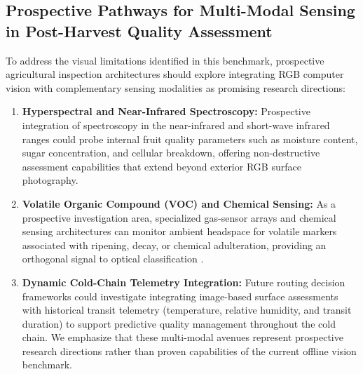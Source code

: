 \vspace*{-3pt}\enlargethispage{\baselineskip}
\subsection{Prospective Pathways for Multi-Modal Sensing in Post-Harvest Quality Assessment}
\label{sec:discussion_recommendations}

To address the visual limitations identified in this benchmark, prospective agricultural inspection architectures should explore integrating RGB computer vision with complementary sensing modalities as promising research directions:
\begin{enumerate}
\setlength{\itemsep}{0pt}
\setlength{\parsep}{0pt}
\setlength{\parskip}{0pt}
\setlength{\topsep}{1pt}
\setlength{\partopsep}{0pt}
\item \textbf{Hyperspectral and Near-Infrared Spectroscopy:} Prospective integration of spectroscopy in the near-infrared and short-wave infrared ranges could probe internal fruit quality parameters such as moisture content, sugar concentration, and cellular breakdown, offering non-destructive assessment capabilities that extend beyond exterior RGB surface photography.
\item \textbf{Volatile Organic Compound (VOC) and Chemical Sensing:} As a prospective investigation area, specialized gas-sensor arrays and chemical sensing architectures can monitor ambient headspace for volatile markers associated with ripening, decay, or chemical adulteration, providing an orthogonal signal to optical classification \cite{sattar2024sensornet}.
\item \textbf{Dynamic Cold-Chain Telemetry Integration:} Future routing decision frameworks could investigate integrating image-based surface assessments with historical transit telemetry (temperature, relative humidity, and transit duration) to support predictive quality management throughout the cold chain. We emphasize that these multi-modal avenues represent prospective research directions rather than proven capabilities of the current offline vision benchmark.
\end{enumerate}
